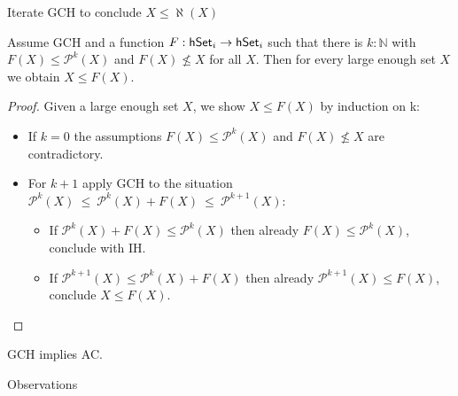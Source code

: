 \documentclass[xcolor=dvipsnames,compress,aspectratio=169,handout]{beamer}
\newcommand{\MBB}[1]{\ensuremath{\mathbb{#1}}\xspace}  %
\newcommand{\MCL}[1]{\ensuremath{\mathcal{#1}}\xspace} %
\newcommand{\Nat}{\MBB{N}}   %
\newcommand{\Pow}{\MCL P}
\begin{document}
\begin{frame}{Iterate GCH to conclude $X\le \aleph(X)$}

	\pause
	\begin{theorem}
		Assume GCH and a function $F:\mathsf{hSet}_i\to\mathsf{hSet}_i$ such that there is $k:\Nat$ with $F(X)\le \Pow^k(X)$ and $F(X)\not\le X$ for all $X$.
		Then for every large enough set $X$ we obtain $X\le F(X)$.
	\end{theorem}
	\vspace{-0.1cm}
	\pause
	\begin{proof}
		\pause
		Given a large enough set $X$, we show $X\le F(X)$ by induction on k:
		\begin{itemize}
			\vspace{0.2cm}
			\pause
			\item
			If $k=0$ the assumptions $F(X)\le \Pow^k(X)$ and $F(X)\not\le X$ are contradictory.
			\vspace{0.2cm}
			\pause
			\item
			For $k+1$ apply GCH to the situation $\Pow^{k}(X)~\le~ \Pow^{k}(X)+F(X)~\le~ \Pow^{k+1}(X)$:
			\begin{itemize}
			\vspace{0.2cm}
			\pause
			\item
			If $\Pow^{k}(X)+F(X)\le \Pow^{k}(X)$ then already $F(X)\le \Pow^{k}(X)$, conclude with IH.
			\vspace{0.2cm}
			\item
			\pause
			If $\Pow^{k+1}(X)\le \Pow^{k}(X)+F(X)$ then already $\Pow^{k+1}(X)\le F(X)$, conclude $X\le F(X)$.
			\qedhere
			\end{itemize}
		\end{itemize}
	\end{proof}
	\pause
	\vspace{-0.1cm}
	\begin{corollary}
		GCH implies AC.
	\end{corollary}
\end{frame}

\begin{frame}
	\Huge
	\centering
	Observations
\end{frame}
\end{document}

